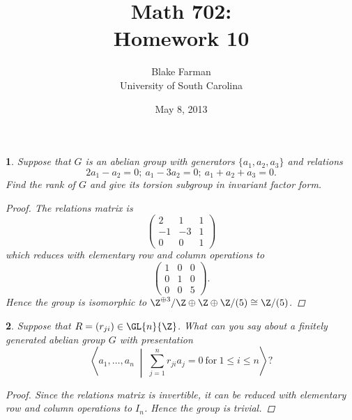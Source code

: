 \documentclass[10pt]{amsart}
\author{Blake Farman\\University of South Carolina}
\title{Math 702:\\Homework 10}
\date{May 8, 2013}
\begin{document}
\maketitle

\providecommand{\p}{\mathfrak{p}}
\providecommand{\m}{\mathfrak{m}}

\newtheorem{thm}{}
\newtheorem{lem}{Lemma}

\begin{thm}
  Suppose that $G$ is an abelian group with generators $\{a_1, a_2, a_3\}$ and relations
  $$2a_1 - a_2 = 0;\ a_1 - 3a_2 = 0;\ a_1 + a_2 + a_3 = 0.$$
  Find the rank of $G$ and give its torsion subgroup in invariant factor form.
  \begin{proof}
    The relations matrix is 
    $$\left(
    \begin{array}{ccc}
      2 & 1 & 1\\
      -1 & -3 & 1\\
      0 & 0 & 1
    \end{array}\right)
    $$
    which reduces with elementary row and column operations to 
    $$\left(
    \begin{array}{ccc}
      1 & 0 & 0\\
      0 & 1 & 0\\
      0 & 0 & 5
    \end{array}\right).
    $$
    Hence the group is isomorphic to $\Z^{\oplus3}/\Z \oplus \Z \oplus \Z/(5)\cong \Z/(5)$.
  \end{proof}
\end{thm}  

\begin{thm}
  Suppose that $R = (r_{ji}) \in \GL{n}{\Z}$.
  What can you say about a finitely generated abelian group $G$ with presentation
  $$\left< a_1, \ldots, a_n \;\middle\vert\; \sum_{j = 1}^n r_{ji}a_j = 0\ \text{for}\ 1 \leq i \leq n \right>?$$
  
  \begin{proof}
    Since the relations matrix is invertible, it can be reduced with elementary row and column operations to $I_n$.
    Hence the group is trivial.
  \end{proof}
\end{thm}  
\end{document}
